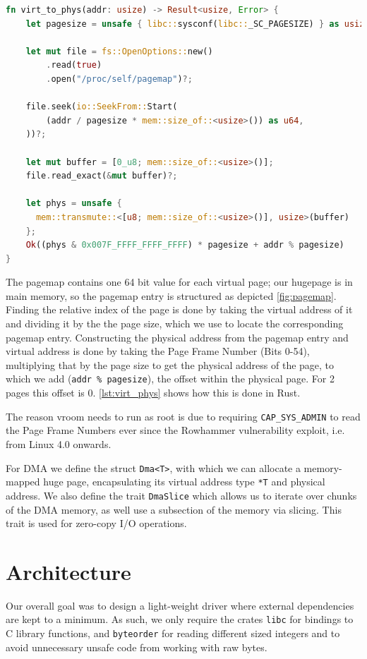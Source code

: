 \begin{lstlisting}[float, language=Rust, label=lst:virt_phys,caption=Translating a virtual address to its physical address]
fn virt_to_phys(addr: usize) -> Result<usize, Error> {
    let pagesize = unsafe { libc::sysconf(libc::_SC_PAGESIZE) } as usize;

    let mut file = fs::OpenOptions::new()
        .read(true)
        .open("/proc/self/pagemap")?;

    file.seek(io::SeekFrom::Start(
        (addr / pagesize * mem::size_of::<usize>()) as u64,
    ))?;

    let mut buffer = [0_u8; mem::size_of::<usize>()];
    file.read_exact(&mut buffer)?;

    let phys = unsafe {
      mem::transmute::<[u8; mem::size_of::<usize>()], usize>(buffer)
    };
    Ok((phys & 0x007F_FFFF_FFFF_FFFF) * pagesize + addr % pagesize)
}
\end{lstlisting}

The pagemap contains one 64 bit value for each virtual page; our hugepage is in main memory, so the pagemap entry is structured as depicted \autoref{fig:pagemap}. Finding the relative index of the page is done by taking the virtual address of it and dividing it by the the page size, which we use to locate the corresponding pagemap entry. Constructing the physical address from the pagemap entry and virtual address is done by taking the Page Frame Number (Bits 0-54), multiplying that by the page size to get the physical address of the page, to which we add (\texttt{addr \% pagesize}), the offset within the physical page. For \qty{2}{\mebi\byte} pages this offset is 0. \autoref{lst:virt_phys} shows how this is done in Rust.

The reason vroom needs to run as root is due to requiring \texttt{CAP\_SYS\_ADMIN} to read the Page Frame Numbers ever since the Rowhammer vulnerability exploit, i.e. from Linux 4.0 onwards.

For DMA we define the struct \texttt{Dma<T>}, with which we can allocate a memory-mapped huge page, encapsulating its virtual address type \texttt{*T} and physical address. We also define the trait \texttt{DmaSlice} which allows us to iterate over chunks of the DMA memory, as well use a subsection of the memory via slicing. This trait is used for zero-copy I/O operations.

\section{Architecture}
Our overall goal was to design a light-weight driver where external dependencies are kept to a minimum. As such, we only require the crates \texttt{libc} for bindings to C library functions, and \texttt{byteorder} for reading different sized integers and to avoid unnecessary unsafe code from working with raw bytes.

